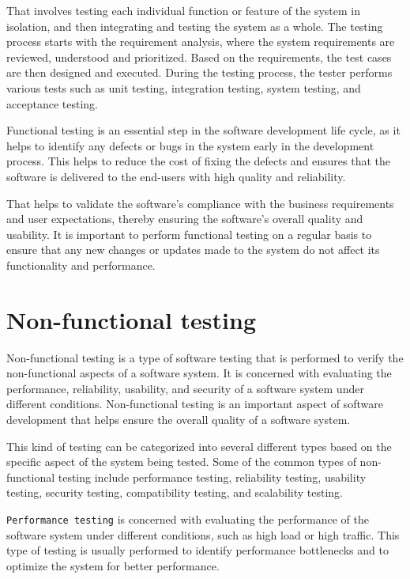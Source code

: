 That involves testing each individual function or feature of the system in isolation, and then 
integrating and testing the system as a whole. The testing process starts with the requirement analysis, 
where the system requirements are reviewed, understood and prioritized. Based on the requirements, 
the test cases are then designed and executed. During the testing process, the tester performs 
various tests such as unit testing, integration testing, system testing, and acceptance testing.

Functional testing is an essential step in the software development life cycle, as it helps to 
identify any defects or bugs in the system early in the development process. This helps to 
reduce the cost of fixing the defects and ensures that the software is delivered to the 
end-users with high quality and reliability.

That helps to validate the software's compliance with the business requirements 
and user expectations, thereby ensuring the software's overall quality and usability. 
It is important to perform functional testing on a regular basis to ensure that 
any new changes or updates made to the system do not affect its functionality and performance.


\section{Non-functional testing}
Non-functional testing is a type of software testing that is performed to verify the non-functional aspects of a software system. 
It is concerned with evaluating the performance, reliability, usability, and security of a software system under different conditions. 
Non-functional testing is an important aspect of software development that helps ensure the overall quality of a software system.

This kind of testing can be categorized into several different types based on the specific aspect of the system being tested. 
Some of the common types of non-functional testing include performance testing, reliability testing, usability testing, 
security testing, compatibility testing, and scalability testing.

\texttt{Performance testing} is concerned with evaluating the performance of the software system under different conditions, 
such as high load or high traffic. This type of testing is usually performed to identify performance bottlenecks and 
to optimize the system for better performance.

